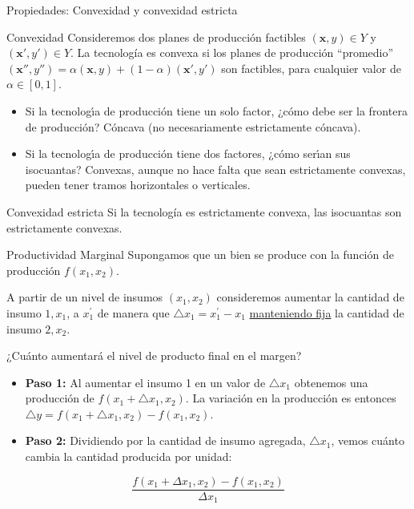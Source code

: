 \documentclass{beamer}
\theoremstyle{definition}
\begin{document}
\begin{frame}{Propiedades: Convexidad y convexidad estricta}
		 	\begin{block}{Convexidad}
		 	Consideremos dos planes de producción factibles $(\textbf{x},y)\in Y$ y $(\textbf{x}',y')\in Y$. La tecnología es convexa si los planes de producción ``promedio'' $(\textbf{x}'',y'')=\alpha(\textbf{x},y)+(1-\alpha)(\textbf{x}',y')$ son factibles, para cualquier valor de $\alpha\in [0,1]$.
		\end{block}
		\begin{itemize}
		\item Si la tecnolog\'{\i}a de producci\'{o}n tiene un solo factor, ¿c\'omo debe ser la frontera de producci\'{o}n? C\'{o}ncava (no necesariamente estrictamente cóncava).
		\item Si la tecnolog\'{\i}a de producci\'{o}n tiene dos factores, ¿c\'{o}mo ser\'{\i}an sus isocuantas? Convexas, aunque no hace falta que sean estrictamente convexas, pueden tener tramos horizontales o verticales.
		\end{itemize}
  \begin{block}{Convexidad estricta}
  Si la tecnología es estrictamente convexa, las isocuantas son estrictamente convexas.
  \end{block}
\end{frame}		
	

\begin{frame}{Productividad Marginal}
Supongamos que un bien se produce con la función de producción $f\left(x_{1}, x_{2}\right)$.
\medskip

A partir de un nivel de insumos $\left(x_{1}, x_{2}\right)$ consideremos aumentar la cantidad de insumo $1, x_{1}$, a $x_{1}^{\prime}$ de manera que $\triangle x_{1}=x_{1}^{\prime}-x_{1}$ \underline{manteniendo fija} la cantidad de insumo $2, x_{2}$. 
\medskip

¿Cuánto aumentará el nivel de producto final en el margen?
\begin{itemize}
    \item \textbf{Paso 1:} Al aumentar el insumo 1 en un valor de $\triangle x_{1}$ obtenemos una producción de $f\left(x_{1}+\triangle x_{1}, x_{2}\right)$. La variación en la producción es entonces $\triangle y=f\left(x_{1}+\triangle x_{1}, x_{2}\right)-f\left(x_{1}, x_{2}\right)$.
\item \textbf{Paso 2:} Dividiendo por la cantidad de insumo agregada, $\triangle x_{1}$, vemos cuánto cambia la cantidad producida por unidad:
\end{itemize}
$$
\frac{f\left(x_{1}+\Delta x_{1}, x_{2}\right)-f\left(x_{1}, x_{2}\right)}{\Delta x_{1}}
$$
\end{frame}		
\end{document}

